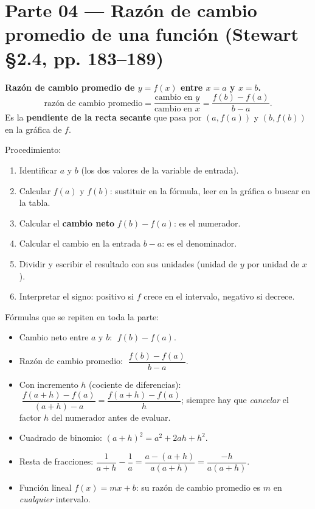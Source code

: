 \documentclass[11pt]{article}
\begin{document}
\section*{Parte 04 — Razón de cambio promedio de una función (Stewart §2.4, pp. 183--189)}

\begin{teo}
\textbf{Razón de cambio promedio de $y=f(x)$ entre $x=a$ y $x=b$.}
\[
\text{razón de cambio promedio}=\frac{\text{cambio en }y}{\text{cambio en }x}=\frac{f(b)-f(a)}{b-a}.
\]
Es la \textbf{pendiente de la recta secante} que pasa por $(a,f(a))$ y $(b,f(b))$ en la gráfica de $f$.

Procedimiento:
\begin{enumerate}[leftmargin=*]
  \item Identificar $a$ y $b$ (los dos valores de la variable de entrada).
  \item Calcular $f(a)$ y $f(b)$: sustituir en la fórmula, leer en la gráfica o buscar en la tabla.
  \item Calcular el \textbf{cambio neto} $f(b)-f(a)$: es el numerador.
  \item Calcular el cambio en la entrada $b-a$: es el denominador.
  \item Dividir y escribir el resultado con sus unidades (unidad de $y$ por unidad de $x$).
  \item Interpretar el signo: positivo si $f$ crece en el intervalo, negativo si decrece.
\end{enumerate}
\end{teo}

\begin{tip}
Fórmulas que se repiten en toda la parte:
\begin{itemize}[leftmargin=*]
  \item Cambio neto entre $a$ y $b$: $\;f(b)-f(a)$.
  \item Razón de cambio promedio: $\;\dfrac{f(b)-f(a)}{b-a}$.
  \item Con incremento $h$ (cociente de diferencias): $\;\dfrac{f(a+h)-f(a)}{(a+h)-a}=\dfrac{f(a+h)-f(a)}{h}$; siempre hay que \emph{cancelar} el factor $h$ del numerador antes de evaluar.
  \item Cuadrado de binomio: $(a+h)^2=a^2+2ah+h^2$.
  \item Resta de fracciones: $\dfrac{1}{a+h}-\dfrac{1}{a}=\dfrac{a-(a+h)}{a(a+h)}=\dfrac{-h}{a(a+h)}$.
  \item Función lineal $f(x)=mx+b$: su razón de cambio promedio es $m$ en \emph{cualquier} intervalo.
\end{itemize}
\end{tip}
\end{document}
